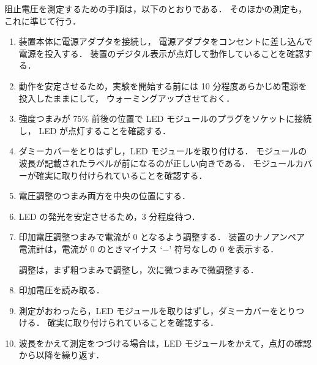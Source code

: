 \documentclass[11pt,sort]{jarticle}
\begin{document}
阻止電圧を測定するための手順は，以下のとおりである．
そのほかの測定も，これに準じて行う．
\begin{enumerate}
\item
装置本体に電源アダプタを接続し，
電源アダプタをコンセントに差し込んで電源を投入する．
装置のデジタル表示が点灯して動作していることを確認する．
\item
動作を安定させるため，実験を開始する前には 10 分程度あらかじめ電源を投入したままにして，
ウォーミングアップさせておく．
\item
強度つまみが 75\% 前後の位置で LED モジュールのプラグをソケットに接続し， LED が点灯することを確認する．
\item
ダミーカバーをとりはずし，LED モジュールを取り付ける．
モジュールの波長が記載されたラベルが前になるのが正しい向きである．
モジュールカバーが確実に取り付けられていることを確認する．
\item
電圧調整のつまみ両方を中央の位置にする．
\item
LED の発光を安定させるため，3 分程度待つ．
\item
印加電圧調整つまみで電流が $0$ となるよう調整する．
装置のナノアンペア電流計は，電流が $0$ のときマイナス `$-$' 符号なしの $0$ を表示する．

調整は，まず粗つまみで調整し，次に微つまみで微調整する．
\item
印加電圧を読み取る．
\item
測定がおわったら，LED モジュールを取りはずし，ダミーカバーをとりつける．
確実に取り付けられていることを確認する．
\item
波長をかえて測定をつづける場合は，LED モジュールをかえて，点灯の確認から以降を繰り返す．
\end{enumerate}
\end{document}
